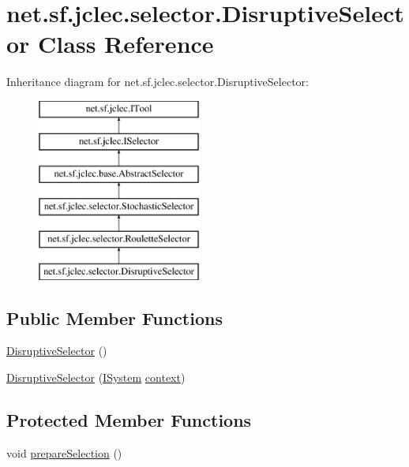 \hypertarget{classnet_1_1sf_1_1jclec_1_1selector_1_1_disruptive_selector}{\section{net.\-sf.\-jclec.\-selector.\-Disruptive\-Selector Class Reference}
\label{classnet_1_1sf_1_1jclec_1_1selector_1_1_disruptive_selector}
}
Inheritance diagram for net.\-sf.\-jclec.\-selector.\-Disruptive\-Selector\-:\begin{figure}[H]
\begin{center}
\leavevmode
\includegraphics[height=6.000000cm]{classnet_1_1sf_1_1jclec_1_1selector_1_1_disruptive_selector}
\end{center}
\end{figure}
\subsection*{Public Member Functions}
\begin{DoxyCompactItemize}
\item 
\hyperlink{classnet_1_1sf_1_1jclec_1_1selector_1_1_disruptive_selector_ae8a25975f086bae8e3b999f21e01fa2b}{Disruptive\-Selector} ()
\item 
\hyperlink{classnet_1_1sf_1_1jclec_1_1selector_1_1_disruptive_selector_a2e61a781ef0210b0f5a4646c166e9d82}{Disruptive\-Selector} (\hyperlink{interfacenet_1_1sf_1_1jclec_1_1_i_system}{I\-System} \hyperlink{classnet_1_1sf_1_1jclec_1_1base_1_1_abstract_selector_a4304fe5c27aa7631dc91678d22473b94}{context})
\end{DoxyCompactItemize}
\subsection*{Protected Member Functions}
\begin{DoxyCompactItemize}
\item 
void \hyperlink{classnet_1_1sf_1_1jclec_1_1selector_1_1_disruptive_selector_a8f9d0833b098d9d1dc91e24804de5043}{prepare\-Selection} ()
\end{DoxyCompactItemize}
